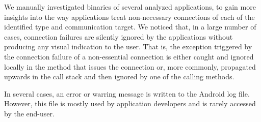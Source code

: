 We manually investigated binaries of several analyzed applications, to gain more insights into the way applications treat non-necessary connections of each of the identified type and communication target. 
We noticed that, in a large number of cases, connection failures are silently ignored by the applications without producing any visual indication to the user. 
That is, the exception triggered by the connection failure of a non-essential connection is either caught and ignored locally in the method that issues the connection or, more commonly, propagated upwards in the call stack and then ignored by one of the calling methods. 

In several cases, an error or warring message is written to the Android log file. However, this file is mostly used by  application developers and is rarely accessed by the end-user.











